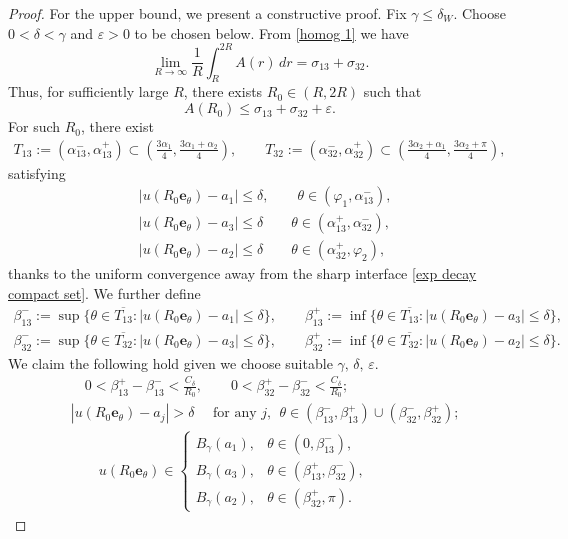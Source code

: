 \documentclass[leqno,11pt]{amsart}
\let\al=\alpha
\let\g=\gamma
\let\d=\delta
\let\f=\frac
\let\e=\varepsilon
\theoremstyle{remark}
\begin{document}
\begin{proof}
For the upper bound, we present a constructive proof. Fix $\g\leq \d_W$. Choose $0<\delta<\g$ and $\e>0$ to be chosen below. From \eqref{homog 1} we have 
\[
\lim_{R\to\infty} \f1R \int_R^{2R} A(r)\,dr =\sigma_{13}+\sigma_{32}. 
\]
Thus, for sufficiently large $R$, there exists $R_0\in (R,2R)$ such that 
\begin{equation}\label{good R0}
A(R_0)\leq \sigma_{13}+\sigma_{32}+\e. 
\end{equation}
For such $R_0$, there exist
\begin{align*}
T_{13}:=(\al_{13}^-,\al_{13}^+) \subset (\f{3\al_1}{4},\f{3\al_1+\al_2}{4}),\qquad T_{32}:=(\al_{32}^-,\al_{32}^+) \subset (\f{3\al_2+\al_1}{4},\f{3\al_2+\pi}{4}),
\end{align*}
satisfying 
\begin{align*}
    &|u(R_0\mathbf{e}_{\theta})-a_1|\leq \delta,\qquad \theta\in (\varphi_1,\al_{13}^-),\\
    &|u(R_0\mathbf{e}_{\theta})-a_3|\leq \delta \qquad \theta\in (\al_{13}^+,\al_{32}^-),\\
    &|u(R_0\mathbf{e}_{\theta})-a_2|\leq \delta \qquad \theta\in (\al_{32}^+,\varphi_2),
\end{align*}
thanks to the uniform convergence away from the sharp interface \eqref{exp decay compact set}. We further define
\begin{align*}
\beta_{13}^-:= \sup\{\theta\in \overline{T_{13}}: |u(R_0\mathbf{e}_\theta)-a_1|\leq \delta\},\qquad \beta_{13}^+:= \inf\{\theta\in \overline{T_{13}}: |u(R_0\mathbf{e}_\theta)-a_3|\leq \delta\},\\
\beta_{32}^-:= \sup\{\theta\in \overline{T_{32}}: |u(R_0\mathbf{e}_\theta)-a_3|\leq \delta\},\qquad \beta_{32}^+:= \inf\{\theta\in \overline{T_{32}}: |u(R_0\mathbf{e}_\theta)-a_2|\leq \delta\}.
\end{align*}
We claim the following hold given we choose suitable $\g,\,\delta,\,\e$.
\begin{align}
    \label{relation of beta+-} &\quad0<\beta_{13}^+-\beta_{13}^-<\f{C_\delta}{R_0},\qquad 0<\beta_{32}^+-\beta_{32}^-<\f{C_\delta}{R_0};\\
    \label{delta dist}&|u(R_0\mathbf{e}_{\theta})-a_j|>\delta \quad\text{ for any }j,\ \ \theta\in  (\beta_{13}^-,\beta_{13}^+)\cup (\beta_{32}^-,\beta_{32}^+);\\
    \label{gamma close phase} & \qquad u(R_0\mathbf{e}_{\theta}) \in \begin{cases}B_{\g}(a_1), &\theta \in (0,\beta_{13}^{-}),\\
    B_{\g}(a_3), & \theta \in (\beta_{13}^{+}, \beta_{32}^-),\\
    B_{\g}(a_2), & \theta \in (\beta_{32}^{+},\pi).
    \end{cases}
\end{align}


\end{proof}
\end{document}
